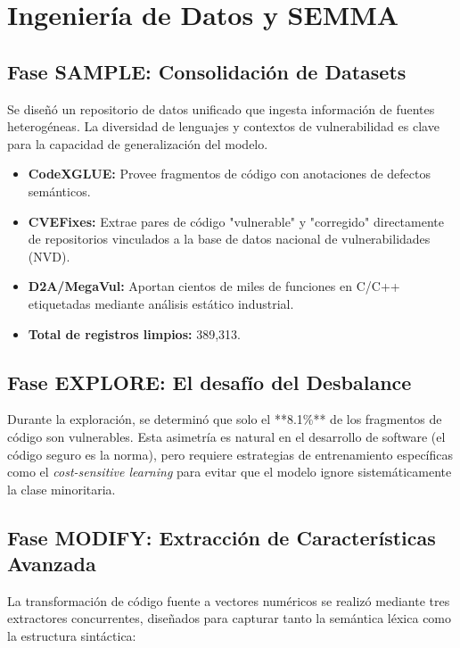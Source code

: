 \documentclass[11pt,a4paper]{article}
\begin{document}
\section{Ingeniería de Datos y SEMMA}

\subsection{Fase SAMPLE: Consolidación de Datasets}
Se diseñó un repositorio de datos unificado que ingesta información de fuentes heterogéneas. La diversidad de lenguajes y contextos de vulnerabilidad es clave para la capacidad de generalización del modelo.

\begin{itemize}[noitemsep]
    \item \textbf{CodeXGLUE:} Provee fragmentos de código con anotaciones de defectos semánticos.
    \item \textbf{CVEFixes:} Extrae pares de código "vulnerable" y "corregido" directamente de repositorios vinculados a la base de datos nacional de vulnerabilidades (NVD).
    \item \textbf{D2A/MegaVul:} Aportan cientos de miles de funciones en C/C++ etiquetadas mediante análisis estático industrial.
    \item \textbf{Total de registros limpios:} 389,313.
\end{itemize}

\subsection{Fase EXPLORE: El desafío del Desbalance}
Durante la exploración, se determinó que solo el **8.1\%** de los fragmentos de código son vulnerables. Esta asimetría es natural en el desarrollo de software (el código seguro es la norma), pero requiere estrategias de entrenamiento específicas como el \textit{cost-sensitive learning} para evitar que el modelo ignore sistemáticamente la clase minoritaria.

\subsection{Fase MODIFY: Extracción de Características Avanzada}
La transformación de código fuente a vectores numéricos se realizó mediante tres extractores concurrentes, diseñados para capturar tanto la semántica léxica como la estructura sintáctica:
\end{document}
